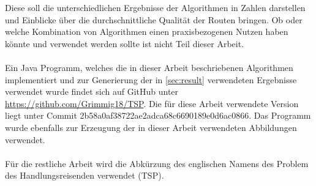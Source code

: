 Diese soll die unterschiedlichen Ergebnisse der Algorithmen in Zahlen darstellen und Einblicke über die durchschnittliche Qualität der Routen bringen.
Ob oder welche Kombination von Algorithmen einen praxisbezogenen Nutzen haben könnte und verwendet werden sollte ist nicht Teil dieser Arbeit.
\\\\
Ein Java Programm, welches die in dieser Arbeit beschriebenen Algorithmen implementiert und zur Generierung der in  \vref{sec:result} verwendeten Ergebnisse verwendet wurde findet sich auf GitHub unter \href{https://github.com/Grimmig18/TSP}{https://github.com/Grimmig18/TSP}. 
Die für diese Arbeit verwendete Version liegt unter Commit 2b58a0af38722ae2adca68c6690189e0d6ac0866.
Das Programm wurde ebenfalls zur Erzeugung der in dieser Arbeit verwendeten Abbildungen verwendet.
\\\\
Für die restliche Arbeit wird die Abkürzung des englischen Namens des Problem des Handlungsreisenden verwendet (\ac{TSP}).
